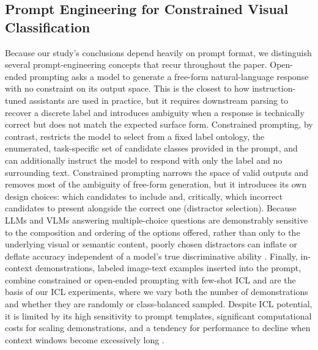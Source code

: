 \documentclass[10pt,letterpaper]{article}
\begin{document}
\subsection{Prompt Engineering for Constrained Visual Classification}
\label{sec:background_prompting}
Because our study's conclusions depend heavily on prompt format, we distinguish several prompt-engineering concepts that recur throughout the paper. Open-ended prompting asks a model to generate a free-form natural-language response with no constraint on its output space. This is the closest to how instruction-tuned assistants are used in practice, but it requires downstream parsing to recover a discrete label and introduces ambiguity when a response is technically correct but does not match the expected surface form. Constrained prompting, by contrast, restricts the model to select from a fixed label ontology, the enumerated, task-specific set of candidate classes provided in the prompt, and can additionally instruct the model to respond with only the label and no surrounding text. Constrained prompting narrows the space of valid outputs and removes most of the ambiguity of free-form generation, but it introduces its own design choices: which candidates to include and, critically, which incorrect candidates to present alongside the correct one (distractor selection). Because LLMs and VLMs answering multiple-choice questions are demonstrably sensitive to the composition and ordering of the options offered, rather than only to the underlying visual or semantic content, poorly chosen distractors can inflate or deflate accuracy independent of a model's true discriminative ability \cite{pezeshkpour_large_2023}. Finally, in-context demonstrations, labeled image-text examples inserted into the prompt, combine constrained or open-ended prompting with few-shot ICL and are the basis of our ICL experiments, where we vary both the number of demonstrations and whether they are randomly or class-balanced sampled. Despite ICL potential, it is limited by its high sensitivity to prompt templates, significant computational costs for scaling demonstrations, and a tendency for performance to decline when context windows become excessively long \cite{dong_survey_2024}.
\end{document}
